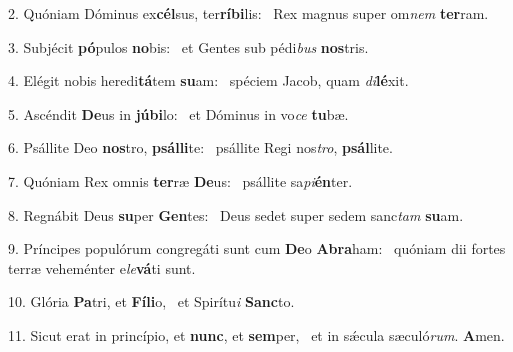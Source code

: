 2. Quóniam Dóminus ex\textbf{cél}sus, ter\textbf{rí}\textbf{bi}lis: \ast\  Rex magnus super om\textit{nem} \textbf{ter}ram.\

3. Subjécit \textbf{pó}pulos \textbf{no}bis: \ast\  et Gentes sub pédi\textit{bus} \textbf{nos}tris.\

4. Elégit nobis heredi\textbf{tá}tem \textbf{su}am: \ast\  spéciem Jacob, quam \textit{di}\textbf{lé}xit.\

5. Ascéndit \textbf{De}us in \textbf{jú}\textbf{bi}lo: \ast\  et Dóminus in vo\textit{ce} \textbf{tu}bæ.\

6. Psállite Deo \textbf{nos}tro, \textbf{psál}\textbf{li}te: \ast\  psállite Regi nos\textit{tro}, \textbf{psál}lite.\

7. Quóniam Rex omnis \textbf{ter}ræ \textbf{De}us: \ast\  psállite sa\textit{pi}\textbf{én}ter.\

8. Regnábit Deus \textbf{su}per \textbf{Gen}tes: \ast\  Deus sedet super sedem sanc\textit{tam} \textbf{su}am.\

9. Príncipes populórum congregáti sunt cum \textbf{De}o \textbf{A}\textbf{bra}ham: \ast\  quóniam dii fortes terræ veheménter e\textit{le}\textbf{vá}ti sunt.\

10. Glória \textbf{Pa}tri, et \textbf{Fí}\textbf{li}o, \ast\  et Spirítu\textit{i} \textbf{Sanc}to.\

11. Sicut erat in princípio, et \textbf{nunc}, et \textbf{sem}per, \ast\  et in sǽcula sæculó\textit{rum}. \textbf{A}men.\

